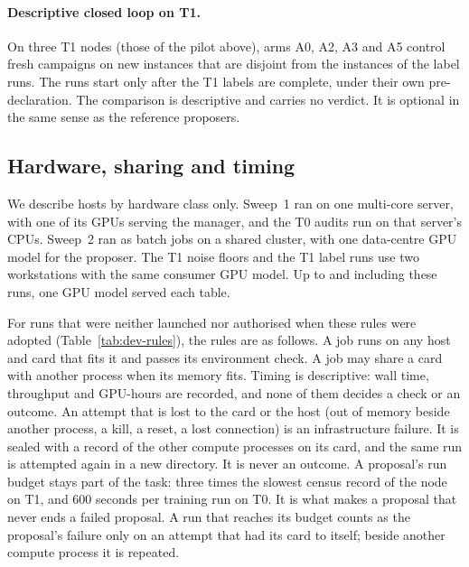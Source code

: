 \paragraph{Descriptive closed loop on T1.}
On three T1 nodes (those of the pilot above), arms A0, A2, A3 and A5 control fresh campaigns on new instances that are disjoint from the instances of the label runs. The runs start only after the T1 labels are complete, under their own pre-declaration. The comparison is descriptive and carries no verdict. It is optional in the same sense as the reference proposers. 

\subsection{Hardware, sharing and timing}
\label{app:hardware}

We describe hosts by hardware class only. Sweep~1 ran on one multi-core server, with one of its GPUs serving the manager, and the T0 audits run on that server's CPUs. Sweep~2 ran as batch jobs on a shared cluster, with one data-centre GPU model for the proposer. The T1 noise floors and the T1 label runs use two workstations with the same consumer GPU model. Up to and including these runs, one GPU model served each table.

For runs that were neither launched nor authorised when these rules were adopted (Table~\ref{tab:dev-rules}), the rules are as follows. A job runs on any host and card that fits it and passes its environment check. A job may share a card with another process when its memory fits. Timing is descriptive: wall time, throughput and GPU-hours are recorded, and none of them decides a check or an outcome. An attempt that is lost to the card or the host (out of memory beside another process, a kill, a reset, a lost connection) is an infrastructure failure. It is sealed with a record of the other compute processes on its card, and the same run is attempted again in a new directory. It is never an outcome. A proposal's run budget stays part of the task: three times the slowest census record of the node on T1, and 600 seconds per training run on T0. It is what makes a proposal that never ends a failed proposal. A run that reaches its budget counts as the proposal's failure only on an attempt that had its card to itself; beside another compute process it is repeated.

